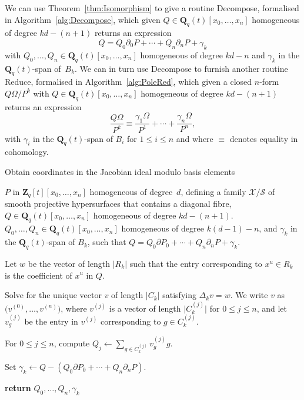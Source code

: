 \documentclass[a4paper,11pt]{article}
\numberwithin{equation}{section}
\providecommand{\abs}[1]{\lvert#1\rvert}                 %
\newcommand{\ZZ}{\mathbf{Z}} %
\newcommand{\QQ}{\mathbf{Q}} %
\theoremstyle{definition}
\begin{document}
We can use Theorem~\ref{thm:Isomorphism} to give a routine {\sc Decompose}, 
formalised in Algorithm~\ref{alg:Decompose}, which given 
$Q \in \QQ_q(t)[x_0, \dotsc, x_n]$ homogeneous of degree $kd - (n+1)$
returns an expression 
\begin{equation*}
Q = Q_0 \partial_0 P + \dotsb + Q_n \partial_n P + \gamma_k
\end{equation*} 
with $Q_0, \dotsc, Q_n \in \QQ_q(t)[x_0, \dotsc, x_n]$ homogeneous of 
degree $kd-n$ and $\gamma_k$ in the $\QQ_q(t)$-span of~$B_k$. We can in turn 
use {\sc Decompose} to furnish another routine {\sc Reduce}, formalised 
in Algorithm~\ref{alg:PoleRed}, which given a closed $n$-form $Q\Omega/P^k$ 
with $Q \in \QQ_q(t)[x_0, \dotsc, x_n]$ homogeneous of degree $kd - (n+1)$ returns 
an expression
\begin{equation*}
\frac{Q \Omega}{P^k} \equiv \frac{\gamma_{1} \Omega}{P^{1}} 
                            + \dotsb + \frac{\gamma_n \Omega}{P^n},
\end{equation*}
with $\gamma_i$ in the $\QQ_q(t)$-span of $B_i$ for $1 \leq i \leq n$ and 
where $\equiv$ denotes equality in cohomology.


\begin{algorithm}
\caption{Obtain coordinates in the Jacobian ideal modulo basis elements}
\label{alg:Decompose}
\begin{algorithmic}
\Require $P$ in $\ZZ_q[t][x_0, \dotsc, x_n]$ homogeneous of degree~$d$, 
         defining a family $\mathcal{X}/\mathcal{S}$ of smooth projective 
         hypersurfaces that contains a diagonal fibre, 
         $Q \in \QQ_q(t)[x_0, \dotsc, x_n]$ homogeneous of degree $kd - (n+1)$.
\Ensure  $Q_0, \dotsc, Q_n \in \QQ_q(t)[x_0, \dotsc, x_n]$ homogeneous of degree 
         $k(d-1)-n$, and $\gamma_k$ in the $\QQ_q(t)$-span of $B_k$, such that 
         $Q = Q_0 \partial P_0 + \dotsb + Q_n \partial_n P +\gamma_k$.
\State \begin{compactenum}[{\hspace{1em}} 1.] \vspace{-1.24em}
\item Let $w$ be the vector of length $\abs{R_k}$ such that the entry 
      corresponding to $x^u \in R_k$ is the coefficient of 
      $x^u$ in $Q$.
\item Solve for the unique vector $v$ of length $\abs{C_k}$ satisfying 
      $\Delta_k v = w$.  We write $v$ 
      as $\bigl(v^{(0)}, \dotsc, v^{(n)}\bigr)$, where $v^{(j)}$ is 
      a vector of length $\abs{C_k^{(j)}}$ for $0 \leq j \leq n$,
      and let $v_g^{(j)}$ be the entry in $v^{(j)}$ corresponding 
      to $g \in C_k^{(j)}$.
\item For $0 \leq j \leq n$, compute $Q_j \gets \sum_{g \in C_k^{(j)}} v_g^{(j)} g$.
\item Set $\gamma_k \gets Q-(Q_0 \partial P_0 + \dotsb + Q_n \partial_n P)$.
\item \textbf{return} $Q_0, \dotsc, Q_n,\gamma_k$      
\EndProcedure
\end{compactenum}
\end{algorithmic}
\end{algorithm}
\end{document}
